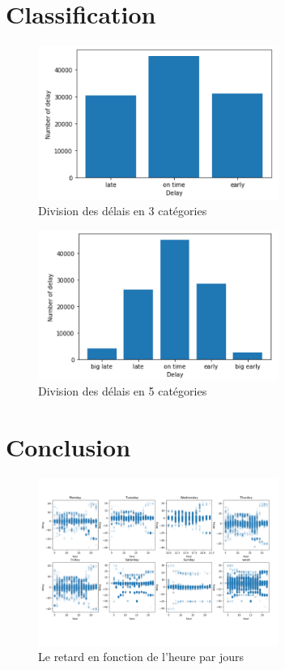 \begin{appendices}
    \chapter{Classification}
    \begin{figure}[ht]
        \centering
        \includegraphics[width=0.7\textwidth]{images/3.png}
        \caption{Division des délais en 3 catégories}
        \label{appendix:3}
    \end{figure}

    \begin{figure}[ht]
        \centering
        \includegraphics[width=0.7\textwidth]{images/5.png}
        \caption{Division des délais en 5 catégories}
        \label{appendix:5}
    \end{figure}

    \chapter{Conclusion}
    \begin{figure}[ht]
        \centering
        \includegraphics[width=0.7\textwidth]{images/delay_day.png}
        \caption{Le retard en fonction de l'heure par jours}
        \label{appendix:delay_day}
    \end{figure}


\end{appendices}

